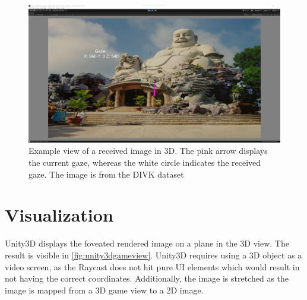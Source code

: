 \begin{figure}[htbp]
    \includegraphics[width=\textwidth,height=\textheight,keepaspectratio]{logos/unity3d.png}
     \caption{Example view of a received image in 3D. The pink arrow displays the current gaze, whereas the white circle indicates the received gaze. The image is from the DIVK dataset \parencite{Agustsson2017}}
    \label{fig:unity3dgameview}
\end{figure}

\section{Visualization}\label{subsection:visualization}
Unity3D displays the foveated rendered image on a plane in the 3D view. The result is visible in \autoref{fig:unity3dgameview}. Unity3D requires using a 3D object as a video screen, as the Raycast does not hit pure UI elements which would result in not having the correct coordinates. Additionally, the image is stretched as the image is mapped from a 3D game view to a 2D image.

